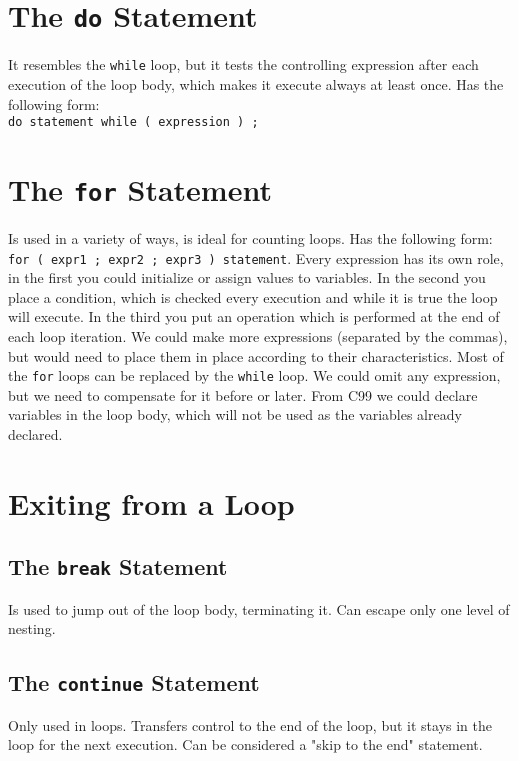 \documentclass[openany]{book}
\begin{document}
    \section{The \texttt{do} Statement}
    It resembles the \texttt{while} loop, but it tests the controlling expression after each execution of the loop body, which makes it execute always at least once. Has the following form: \\
    \texttt{do statement while ( expression ) ;}
    
    \section{The \texttt{for} Statement}
    Is used in a variety of ways, is ideal for counting loops. Has the following form: \texttt{for ( expr1 ; expr2 ; expr3 ) statement}. Every expression has its own role, in the first you could initialize or assign values to variables. In the second you place a condition, which is checked every execution and while it is true the loop will execute. In the third you put an operation which is performed at the end of each loop iteration. We could make more expressions (separated by the commas), but would need to place them in place according to their characteristics. Most of the \texttt{for} loops can be replaced by the \texttt{while} loop. We could omit any expression, but we need to compensate for it before or later. From C99 we could declare variables in the loop body, which will not be used as the variables already declared.
    

    \section{Exiting from a Loop}

    \subsection{The \texttt{break} Statement}
    Is used to jump out of the loop body, terminating it. Can escape only one level of nesting.

    \subsection{The \texttt{continue} Statement}
    Only used in loops. Transfers control to the end of the loop, but it stays in the loop for the next execution. Can be considered a "skip to the end" statement.
\end{document}
